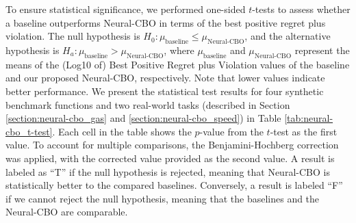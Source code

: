 To ensure statistical significance, we performed one-sided $t$-tests to assess whether a baseline outperforms Neural-CBO in terms of the best positive regret plus violation. The null hypothesis is $H_0: \mu_\text{baseline} \leq \mu_{\text{Neural-CBO}}$, and the alternative hypothesis is $H_a: \mu_\text{baseline} > \mu_{\text{Neural-CBO}}$, where $\mu_\text{baseline}$ and $\mu_{\text{Neural-CBO}}$ represent the means of the (Log10 of) Best Positive Regret plus Violation values of the baseline and our proposed Neural-CBO, respectively. Note that lower values indicate better performance. We present the statistical test results for four synthetic benchmark functions and two real-world tasks (described in Section \ref{section:neural-cbo_gas} and \ref{section:neural-cbo_speed}) in Table \ref{tab:neural-cbo_t-test}. Each cell in the table shows the $p$-value from the $t$-test as the first value. To account for multiple comparisons, the Benjamini-Hochberg correction was applied, with the corrected value provided as the second value. A result is labeled as ``T'' if the null hypothesis is rejected, meaning that Neural-CBO is statistically better to the compared baselines. Conversely, a result is labeled ``F'' if we cannot reject the null hypothesis, meaning that the baselines and the Neural-CBO are comparable.
\begin{table}[ht]
\caption{One-sided $t$-tests to evaluate whether the baseline outperforms Neural-CBO in terms of the best positive regret plus violation.}
  \vspace{0.15in}
\end{table}


